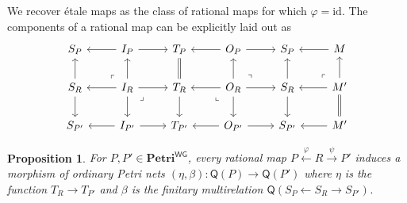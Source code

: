 \documentclass[11pt,a4paper]{article}
\theoremstyle{plain}
\newtheorem{proposition}[theorem]{Proposition}
\theoremstyle{definition}
\theoremstyle{remark}
\newcommand{\WGPetri}{\mathbf{Petri}^{\mathsf{WG}}}
\newcommand{\Q}{\mathsf{Q}}
\newcommand{\id}{\mathrm{id}}
\begin{document}
We recover \'etale maps as the class of rational maps for which $\varphi = \id$.
The components of a rational map can be explicitly laid out as
\[\begin{tikzcd}
	{S_P} & {I_P} & {T_P} & {O_P} & {S_P} & M \\
	{S_R} & {I_R} & {T_R} & {O_R} & {S_R} & {M'} \\
	{S_{P'}} & {I_{P'}} & {T_{P'}} & {O_{P'}} & {S_{P'}} & {M'}
	\arrow[from=1-2, to=1-1]
	\arrow[from=1-2, to=1-3]
	\arrow[from=1-4, to=1-3]
	\arrow[from=1-4, to=1-5]
	\arrow[from=1-6, to=1-5]
	\arrow[from=2-1, to=1-1]
	\arrow[from=2-1, to=3-1]
	\arrow["\lrcorner"{anchor=center, pos=0.125, rotate=180}, draw=none, from=2-2, to=1-1]
	\arrow[from=2-2, to=1-2]
	\arrow[from=2-2, to=2-1]
	\arrow[from=2-2, to=2-3]
	\arrow[from=2-2, to=3-2]
	\arrow["\lrcorner"{anchor=center, pos=0.125}, draw=none, from=2-2, to=3-3]
	\arrow[equals, from=2-3, to=1-3]
	\arrow[from=2-3, to=3-3]
	\arrow[from=2-4, to=1-4]
	\arrow["\lrcorner"{anchor=center, pos=0.125, rotate=90}, draw=none, from=2-4, to=1-5]
	\arrow[from=2-4, to=2-3]
	\arrow[from=2-4, to=2-5]
	\arrow["\lrcorner"{anchor=center, pos=0.125, rotate=-90}, draw=none, from=2-4, to=3-3]
	\arrow[from=2-4, to=3-4]
	\arrow[from=2-5, to=1-5]
	\arrow[from=2-5, to=3-5]
	\arrow["\lrcorner"{anchor=center, pos=0.125, rotate=180}, draw=none, from=2-6, to=1-5]
	\arrow[from=2-6, to=1-6]
	\arrow[from=2-6, to=2-5]
	\arrow[from=3-2, to=3-1]
	\arrow[from=3-2, to=3-3]
	\arrow[from=3-4, to=3-3]
	\arrow[from=3-4, to=3-5]
	\arrow[equals, from=3-6, to=2-6]
	\arrow[from=3-6, to=3-5]
\end{tikzcd}\]
\begin{proposition}
 \label{prop:Qonmor}
  For $P, P' \in \WGPetri$, every rational map $P \xleftarrow{\varphi} R \xrightarrow{\psi} P'$
  induces a morphism of ordinary Petri nets $(\eta, \beta): \Q(P) \to \Q(P')$ where $\eta$ is the
  function $T_R \to T_{P'}$ and $\beta$ is the finitary multirelation
  $\Q(S_P \leftarrow S_R \to S_{P'})$.
\end{proposition}
\end{document}
